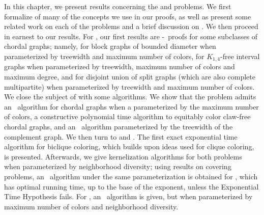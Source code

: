 In this chapter, we present results concerning the  and  problems.
We first formalize of many of the concepts we use in our proofs, as well as present some related work on each of the problems and a brief discussion on .
We then proceed in earnest to our results.
For , our first results are \W[1]-\Hness\ proofs for some subclasses of chordal graphs; namely, for block graphs of bounded diameter when parameterized by treewidth and maximum number of colors, for $K_{1,4}$-free interval graphs when parameterized by treewidth, maximum number of colors and maximum degree, and for disjoint union of split graphs (which are also complete multipartite) when parameterized by treewidth and maximum number of colors.
We close the subject of  with some algorithms.
We show that the problem admits an \XP\ algorithm for chordal graphs when a parameterized by the maximum number of colors, a constructive polynomial time algorithm to equitably color claw-free chordal graphs, and an \FPT\ algorithm parameterized by the treewidth of the complement graph.
We then turn to  and .
The first exact exponential time algorithm for biclique coloring, which builds upon ideas used for clique coloring, is presented.
Afterwards, we give kernelization algorithms for both problems when parameterized by neighborhood diversity; using results on covering problems, an \FPT\ algorithm under the same parameterization is obtained for , which has optimal running time, up to the base of the exponent, unless the Exponential Time Hypothesis fails.
For , an \FPT\ algorithm is given, but when parameterized by maximum number of colors and neighborhood diversity.








